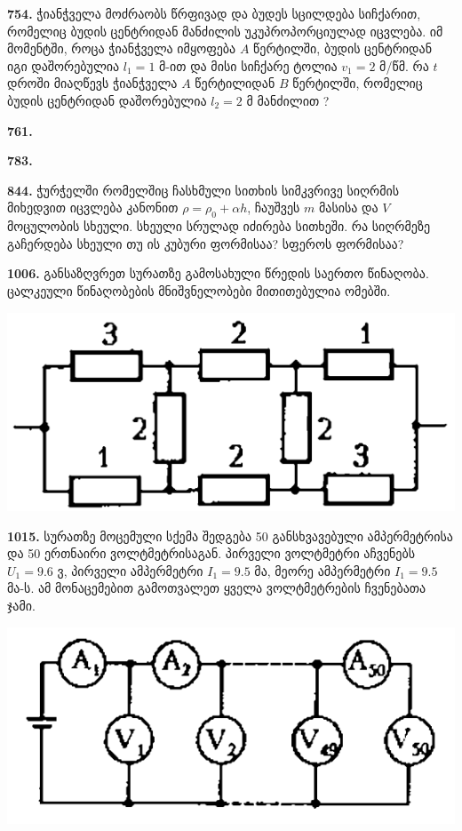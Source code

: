 \documentclass[12pt,a4paper,]{report}
\begin{document}
\textbf{754.} ჭიანჭველა მოძრაობს წრფივად და ბუდეს სცილდება სიჩქარით, რომელიც ბუდის ცენტრიდან მანძილის უკუპროპორციულად იცვლება. იმ მომენტში, როცა ჭიანჭველა იმყოფება $A$ წერტილში, ბუდის ცენტრიდან იგი დაშორებულია $l_1=1$ მ-ით და მისი სიჩქარე ტოლია  $v_1=2$ მ/წმ. რა $t$ დროში მიაღწევს ჭიანჭველა $A$ წერტილიდან $B$ წერტილში, რომელიც ბუდის ცენტრიდან დაშორებულია $l_2=2$ მ მანძილით ? 

\textbf{761.} 

\textbf{783.} 

\textbf{844.} ჭურჭელში რომელშიც ჩასხმული სითხის სიმკვრივე სიღრმის მიხედვით იცვლება კანონით $\rho=\rho_0+\alpha h$, ჩაუშვეს $m$ მასისა და $V$ მოცულობის სხეული. სხეული სრულად იძირება სითხეში. რა სიღრმეზე გაჩერდება სხეული თუ ის კუბური ფორმისაა? სფეროს ფორმისაა?

\textbf{1006.} განსაზღვრეთ სურათზე გამოსახული წრედის საერთო წინაღობა. ცალკეული წინაღობების მნიშვნელობები მითითებულია ომებში. 
		\begin{center}
			\includegraphics[scale=0.4]{images/1006.png}
		\end{center}

\textbf{1015.} სურათზე მოცემული სქემა შედგება 50 განსხვავებული ამპერმეტრისა და 50 ერთნაირი ვოლტმეტრისაგან. პირველი ვოლტმეტრი აჩვენებს $U_1=9.6$ ვ, პირველი ამპერმეტრი $I_1=9.5$ მა, მეორე ამპერმეტრი $I_1=9.5$ მა-ს. ამ მონაცემებით გამოთვალეთ ყველა ვოლტმეტრების ჩვენებათა ჯამი. 
		\begin{center}
			\includegraphics[scale=0.4]{images/1015.png}
		\end{center}
\end{document}
